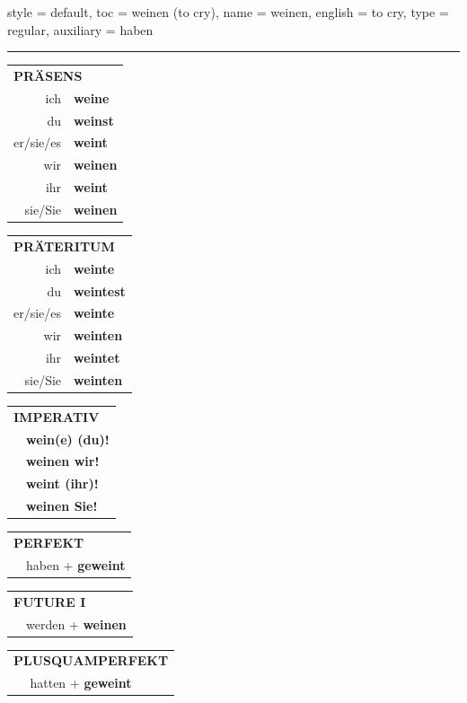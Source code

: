 \begin{verbentry}{
  style = {default},
  toc = {weinen (to cry)},
  name = {weinen},
  english = {to cry},
  type = {regular},
  auxiliary = {haben}
}


\vspace{5pt}
\hrule
\vspace{5pt}

\begin{tabular}{rl}
\multicolumn{2}{l}{\textbf{PRÄSENS}}\\
ich & \textbf{weine}\\
du & \textbf{weinst}\\
er/sie/es & \textbf{weint}\\
wir & \textbf{weinen}\\
ihr & \textbf{weint}\\
sie/Sie & \textbf{weinen}\\
\end{tabular}
\hfill
\begin{tabular}{rl}
\multicolumn{2}{l}{\textbf{PRÄTERITUM}}\\
ich & \textbf{weinte}\\
du & \textbf{weintest}\\
er/sie/es & \textbf{weinte}\\
wir & \textbf{weinten}\\
ihr & \textbf{weintet}\\
sie/Sie & \textbf{weinten}\\
\end{tabular}
\hfill
\begin{tabular}{rl}
\multicolumn{2}{l}{\textbf{IMPERATIV}}\\
& \textbf{wein(e) (du)!}\\
& \textbf{weinen wir!}\\
& \textbf{weint (ihr)!}\\
& \textbf{weinen Sie!}\\
\end{tabular}

\vspace{10pt}

\begin{tabular}{rl}
\multicolumn{2}{l}{\textbf{PERFEKT}}\\
& haben + \textbf{geweint}\\
\end{tabular}
\hfill
\begin{tabular}{rl}
\multicolumn{2}{l}{\textbf{FUTURE I}}\\
& werden + \textbf{weinen}\\
\end{tabular}
\hfill
\begin{tabular}{rl}
\multicolumn{2}{l}{\textbf{PLUSQUAMPERFEKT}}\\
& hatten + \textbf{geweint}\\
\end{tabular}


\end{verbentry}
